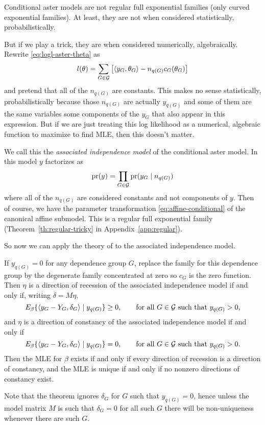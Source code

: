 Conditional aster models are not regular full exponential families
(only curved exponential families).  At least, they are not when
considered statistically, probabilistically.

But if we play a trick, they are when considered numerically, algebraically.
Rewrite \eqref{eq:logl-aster-theta} as
\begin{equation} \label{eq:logl-aster-theta-tricky}
   l(\theta)
   =
   \sum_{G \in \mathcal{G}}
   \left[ \langle y_G, \theta_G \rangle - n_{q(G)} c_G(\theta_G) \right]
\end{equation}
and pretend that all of the $n_{q(G)}$ are constants.  This makes no
sense statistically, probabilistically because those $n_{q(G)}$ are actually
$y_{q(G)}$ and some of them are the same variables some components of the
$y_G$ that also appear in this expression.  But if we are just treating
this log likelihood as a numerical, algebraic function to maximize to find
MLE, then this doesn't matter.

We call this the \emph{associated independence model} of the conditional
aster model.  In this model $y$ factorizes as
\begin{equation} \label{eq:factorize-tricky}
   \operatorname{pr}(y) = \prod_{G \in \mathcal{G}} \operatorname{pr}(y_G \mid n_{q(G)})
\end{equation}
where all of the $n_{q(G)}$ are considered constants and not components of $y$.
Then of course, we have the parameter transformation
\eqref{eq:affine-conditional} of the canonical affine submodel.
This is a regular full exponential family (Theorem~\ref{th:regular-tricky}
in Appendix~\ref{app:regular}).

So now we can apply the theory of \citet{geyer-gdor} to the associated
independence model.
\begin{theorem} \label{th:aim-mle}
If $y_{q(G)} = 0$ for any dependence group $G$, replace
the family for this dependence group by the degenerate family concentrated
at zero so $c_G$ is the zero function.
Then $\eta$ is a direction of recession of the associated independence model
if and only if, writing $\delta = M \eta$,
$$
   E_\beta\{ \langle y_G - Y_G, \delta_G \rangle \mid y_{q(G)} \} \ge 0,
   \qquad \text{for all $G \in \mathcal{G}$ such that $y_{q(G)} > 0$},
$$
and $\eta$ is a direction of constancy of the associated independence model
if and only if
$$
   E_\beta\{ \langle y_G - Y_G, \delta_G \rangle \mid y_{q(G)} \} = 0,
   \qquad \text{for all $G \in \mathcal{G}$ such that $y_{q(G)} > 0$}.
$$
Then the MLE for $\beta$ exists if and only if every direction of recession
is a direction of constancy, and the MLE is unique if and only if no nonzero
directions of constancy exist.
\end{theorem}
Note that the theorem ignores $\delta_G$ for $G$ such that $y_{q(G)} = 0$,
hence unless the model matrix $M$ is such that $\delta_G = 0$ for all such $G$
there will be non-uniqueness whenever there are such $G$.

